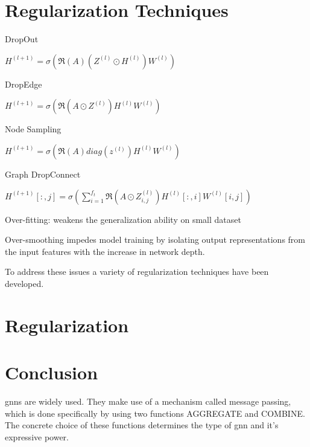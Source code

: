 \section{Regularization Techniques}
\label{sec:related:sec5}
DropOut

$H^{(l+1)} = \sigma(\mathfrak{R}(A)(Z^{(l)}\odot H^{(l)}) W^{(l)})$


DropEdge

$H^{(l+1)} = \sigma(\mathfrak{R}(A \odot Z^{(l)}) H^{(l)} W^{(l)})$


Node Sampling

$H^{(l+1)} = \sigma (\mathfrak{R}(A) diag(z^{(l)}) H^{(l)} W^{(l)})$


Graph DropConnect


$H^{(l+1)}[:,j] = \sigma (\sum_{i=1}^{f_{t}}\mathfrak{R}(A \odot Z_{i,j}^{(l)})H^{(l)}[:,i]W^{(l)}[i,j])$



Over-fitting: weakens the generalization ability on small dataset

Over-smoothing impedes model training by isolating output representations from the input features with the increase in network depth.

To address these issues a variety of regularization techniques have been developed.

\section{Regularization}



\section{Conclusion}
\label{sec:related:conclusion}
\acp{gnn} are widely used. They make use of a mechanism called message passing, which
is done specifically by using two functions AGGREGATE and COMBINE.
The concrete choice of these functions determines the type of \ac{gnn}
and it's expressive power.